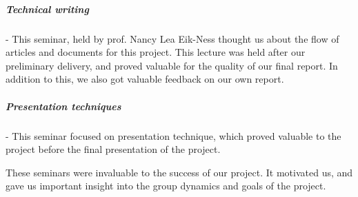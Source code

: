   \subparagraph{Technical writing} - This seminar, held by prof. Nancy Lea
  Eik-Ness thought us about the flow of articles and documents for this project.
  This lecture was held after our preliminary delivery, and proved valuable for
  the quality of our final report. In addition to this, we also got valuable
  feedback on our own report.

  \subparagraph{Presentation techniques} - This seminar focused on presentation
  technique, which proved valuable to the project before the final presentation
  of the project.

  These seminars were invaluable to the success of our project. It motivated us,
  and gave us important insight into the group dynamics and goals of the
  project.

